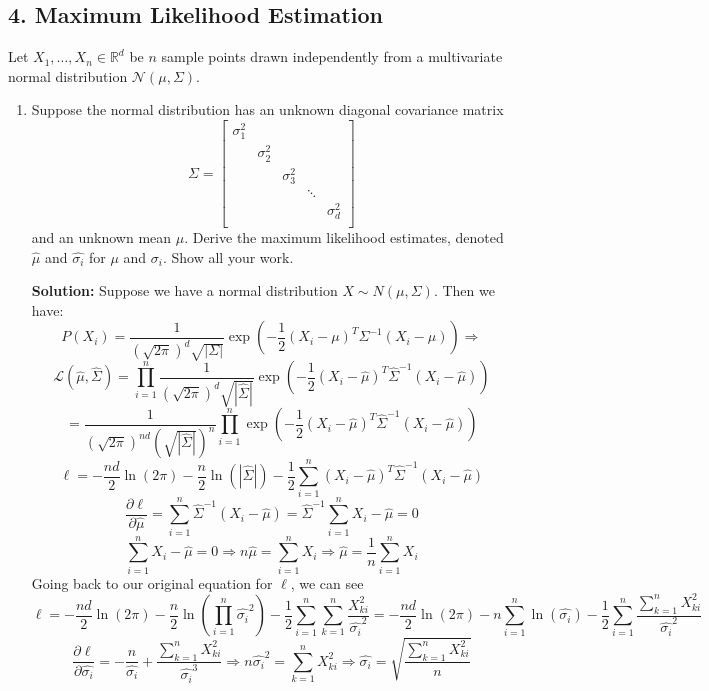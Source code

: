 \documentclass{article}
\newcommand{\solution}{\textbf{Solution: }}
\newcommand{\N}{\mathcal{N}}
\newcommand{\R}{\mathbb{R}}
\newcommand{\Ell}{\mathcal{L}}
\begin{document}
\subsection*{4. Maximum Likelihood Estimation}
Let $X_1, \ldots, X_n \in \R^d$ be $n$ sample points drawn independently from a multivariate normal distribution $\N(\mu, \Sigma)$. 
\begin{enumerate}[label=(\alph*)]
    \item Suppose the normal distribution has an unknown diagonal covariance matrix
    $$
    \Sigma = 
    \begin{bmatrix}
    \sigma_1^2 & & & & \\
    & \sigma_2^2 & & & \\
    & & \sigma_3^2 & & \\
    & & & \ddots & \\
    & & & & \sigma_d^2 \\
    \end{bmatrix}
    $$
    and an unknown mean $\mu$. Derive the maximum likelihood estimates, denoted $\hat{\mu}$ and $\hat{\sigma_i}$ for $\mu$ and $\sigma_i$. Show all your work. 
    \begin{mdframed} \solution
    Suppose we have a normal distribution $X \sim N(\mu, \Sigma)$. Then we have:
    $$P(X_i)=\frac{1}{(\sqrt{2\pi})^d\sqrt{|\Sigma|}}\exp(-\frac{1}{2}(X_i-\mu)^T\Sigma^{-1}(X_i-\mu))\Rightarrow$$
    $$\Ell (\hat{\mu}, \hat{\Sigma})=\prod_{i=1}^n\frac{1}{(\sqrt{2\pi})^d\sqrt{|\hat{\Sigma}|}}\exp(-\frac{1}{2}(X_i-\hat{\mu})^T\hat{\Sigma}^{-1}(X_i-\hat{\mu}))$$
    $$=\frac{1}{(\sqrt{2\pi})^{nd}(\sqrt{|\hat{\Sigma}|})^n}\prod_{i=1}^n\exp(-\frac{1}{2}(X_i-\hat{\mu})^T\hat{\Sigma}^{-1}(X_i-\hat{\mu}))$$
    $$\ell=-\frac{nd}{2}\ln(2\pi)-\frac{n}{2}\ln(|\hat{\Sigma}|)-\frac{1}{2}\sum_{i=1}^n(X_i-\hat{\mu})^T\hat{\Sigma}^{-1}(X_i-\hat{\mu})$$
    $$\frac{\partial \ell}{\partial \hat{\mu}}=\sum_{i=1}^n\hat{\Sigma}^{-1}(X_i-\hat{\mu})=\hat{\Sigma}^{-1}\sum_{i=1}^n X_i-\hat{\mu}=0$$
    $$\sum_{i=1}^n X_i-\hat{\mu}=0\Rightarrow n\hat{\mu} = \sum_{i=1}^nX_i \Rightarrow \hat{\mu}=\frac{1}{n}\sum_{i=1}^n X_i$$
    Going back to our original equation for $\ell$, we can see
    $$\ell=-\frac{nd}{2}\ln(2\pi)-\frac{n}{2}\ln(\prod_{i=1}^{n}\hat{\sigma_i}^2)-\frac{1}{2}\sum_{i=1}^n\sum_{k=1}^n\frac{X_{ki}^2}{\hat{\sigma_i}^2}=-\frac{nd}{2}\ln(2\pi)-n\sum_{i=1}^n\ln(\hat{\sigma_i})-\frac{1}{2}\sum_{i=1}^n\frac{\sum_{k=1}^nX_{ki}^2}{\hat{\sigma_i}^2}$$
    $$\frac{\partial \ell}{\partial \hat{\sigma_i}}=-\frac{n}{\hat{\sigma_i}}+\frac{\sum_{k=1}^nX_{ki}^2}{\hat{\sigma_i}^3}\Rightarrow n\hat{\sigma_i}^2=\sum_{k=1}^nX_{ki}^2 \Rightarrow \hat{\sigma_i}=\sqrt{\frac{\sum_{k=1}^nX_{ki}^2}{n}}$$

\end{mdframed}
\end{enumerate}
\end{document}
